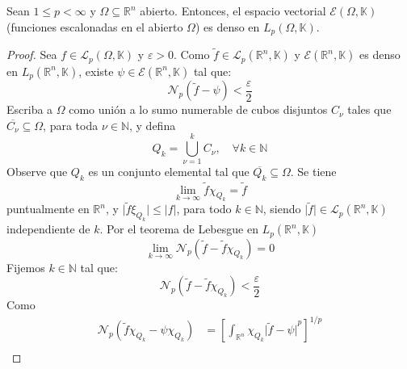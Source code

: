 \documentclass[12pt]{report}
\theoremstyle{largebreak}
\newcommand\abs[1]{\ensuremath{\big|#1\big|}}
\newcommand{\N}[2]{\ensuremath{\mathcal{N}_{#1}\left(#2\right)}}
\begin{document}
    \begin{theor}
        Sean $1\leq p<\infty$ y $\Omega\subseteq\mathbb{R}^n$ abierto. Entonces, el espacio vectorial $\mathcal{E}(\Omega,\mathbb{K})$ (funciones escalonadas en el abierto $\Omega$) es denso en $L_p(\Omega,\mathbb{K})$.
    \end{theor}

    \begin{proof}
        Sea $f\in\mathcal{L}_p(\Omega,\mathbb{K})$ y $\varepsilon>0$. Como $\widetilde{f}\in\mathcal{L}_p(\mathbb{R}^n,\mathbb{K})$ y $\mathcal{E}(\mathbb{R}^n,\mathbb{K})$ es denso en $L_p(\mathbb{R}^n,\mathbb{K})$, existe $\psi\in\mathcal{E}(\mathbb{R}^n,\mathbb{K})$ tal que:
        \begin{equation*}
            \N{p}{\widetilde{f}-\psi}<\frac{\varepsilon}{2}
        \end{equation*}
        Escriba a $\Omega$ como unión a lo sumo numerable de cubos disjuntos $C_\nu$ tales que $\overline{C_\nu}\subseteq\Omega$, para toda $\nu\in\mathbb{N}$, y defina
        \begin{equation*}
            Q_k=\bigcup_{\nu=1}^kC_\nu,\quad\forall k\in\mathbb{N}
        \end{equation*}
        Observe que $Q_k$ es un conjunto elemental tal que $\overline{Q_k}\subseteq\Omega$. Se tiene
        \begin{equation*}
            \lim_{k\rightarrow\infty}\widetilde{f}\chi_{Q_k}=\widetilde{f}
        \end{equation*}
        puntualmente en $\mathbb{R}^n$, y $\abs{\widetilde{f}\xi_{Q_k}}\leq\abs{f}$, para todo $k\in\mathbb{N}$, siendo $\abs{\widetilde{f}}\in\mathcal{L}_p(\mathbb{R}^n,\mathbb{K})$ independiente de $k$. Por el teorema de Lebesgue en $L_p(\mathbb{R}^n,\mathbb{K})$
        \begin{equation*}
            \lim_{k\rightarrow\infty}\N{p}{\widetilde{f}-\widetilde{f}\chi_{Q_k}}=0
        \end{equation*}
        Fijemos $k\in\mathbb{N}$ tal que:
        \begin{equation*}
            \N{p}{\widetilde{f}-\widetilde{f}\chi_{Q_k}}<\frac{\varepsilon}{2}
        \end{equation*}
        Como
        \begin{equation*}
            \begin{split}
                \N{p}{\widetilde{f}\chi_{Q_k}-\psi\chi_{Q_k}}&=\left[\int_{\mathbb{R}^n}\chi_{Q_k}\abs{\widetilde{f}-\psi}^p \right]^{1/p}\\

\end{split}
\end{equation*}
\end{proof}
\end{document}
